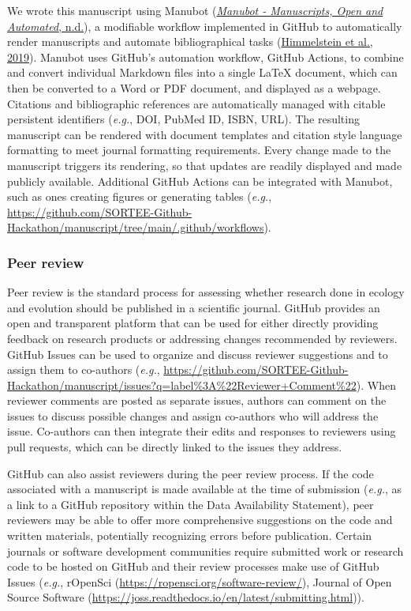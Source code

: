We wrote this manuscript using Manubot (\protect\hyperlink{ref-Re6Eg2va}{\emph{Manubot - Manuscripts, Open and Automated}, n.d.}), a modifiable workflow implemented in GitHub to automatically render manuscripts and automate bibliographical tasks (\protect\hyperlink{ref-YuJbg3zO}{Himmelstein et al., 2019}).
Manubot uses GitHub's automation workflow, GitHub Actions, to combine and convert individual Markdown files into a single LaTeX document, which can then be converted to a Word or PDF document, and displayed as a webpage.
Citations and bibliographic references are automatically managed with citable persistent identifiers (\emph{e.g.}, DOI, PubMed ID, ISBN, URL).
The resulting manuscript can be rendered with document templates and citation style language formatting to meet journal formatting requirements.
Every change made to the manuscript triggers its rendering, so that updates are readily displayed and made publicly available.
Additional GitHub Actions can be integrated with Manubot, such as ones creating figures or generating tables (\emph{e.g.}, \url{https://github.com/SORTEE-Github-Hackathon/manuscript/tree/main/.github/workflows}).

\hypertarget{peer-review}{%
\subsubsection{Peer review}\label{peer-review}}

Peer review is the standard process for assessing whether research done in ecology and evolution should be published in a scientific journal.
GitHub provides an open and transparent platform that can be used for either directly providing feedback on research products or addressing changes recommended by reviewers.
GitHub Issues can be used to organize and discuss reviewer suggestions and to assign them to co-authors (\emph{e.g.}, \url{https://github.com/SORTEE-Github-Hackathon/manuscript/issues?q=label\%3A\%22Reviewer+Comment\%22}).
When reviewer comments are posted as separate issues, authors can comment on the issues to discuss possible changes and assign co-authors who will address the issue.
Co-authors can then integrate their edits and responses to reviewers using pull requests, which can be directly linked to the issues they address.

GitHub can also assist reviewers during the peer review process.
If the code associated with a manuscript is made available at the time of submission (\emph{e.g.}, as a link to a GitHub repository within the Data Availability Statement), peer reviewers may be able to offer more comprehensive suggestions on the code and written materials, potentially recognizing errors before publication.
Certain journals or software development communities require submitted work or research code to be hosted on GitHub and their review processes make use of GitHub Issues (\emph{e.g.}, rOpenSci (\url{https://ropensci.org/software-review/}), Journal of Open Source Software (\url{https://joss.readthedocs.io/en/latest/submitting.html})).

